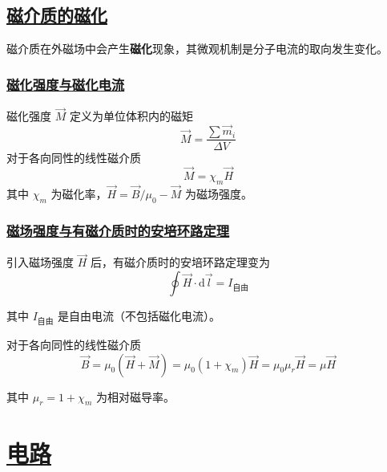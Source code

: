 \subsection{\protect\hyperlink{:}{磁介质的磁化}}

磁介质在外磁场中会产生\textbf{磁化}现象，其微观机制是分子电流的取向发生变化。

\subsubsection{\protect\hyperlink{:}{磁化强度与磁化电流}}

\begin{definition}[磁化强度]
    磁化强度 $\vec{M}$ 定义为单位体积内的磁矩
    \begin{equation}
        \vec{M} = \frac{\sum \vec{m}_i}{\Delta V}
    \end{equation}
    对于各向同性的线性磁介质
    \begin{equation}
        \vec{M} = \chi_m \vec{H}
    \end{equation}
    其中 $\chi_m$ 为磁化率，$\vec{H} = \vec{B}/\mu_0 - \vec{M}$ 为磁场强度。
\end{definition}

\subsubsection{\protect\hyperlink{:}{磁场强度与有磁介质时的安培环路定理}}

引入磁场强度 $\vec{H}$ 后，有磁介质时的安培环路定理变为
\begin{equation}
    \oint \vec{H} \cdot \mathrm{d}\vec{l} = I_{\text{自由}}
\end{equation}

其中 $I_{\text{自由}}$ 是自由电流（不包括磁化电流）。

对于各向同性的线性磁介质
\begin{equation}
    \vec{B} = \mu_0(\vec{H} + \vec{M}) = \mu_0(1 + \chi_m)\vec{H} = \mu_0\mu_r\vec{H} = \mu\vec{H}
\end{equation}

其中 $\mu_r = 1 + \chi_m$ 为相对磁导率。


\newpage
\section{\protect\hyperlink{:}{电路}}

